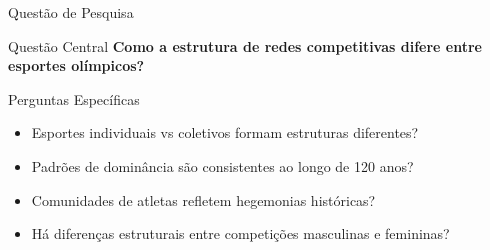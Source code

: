 \begin{frame}[shrink=5]{Questão de Pesquisa}
    \begin{alertblock}{\centering Questão Central}
        \centering
        \textbf{Como a estrutura de redes competitivas difere entre esportes olímpicos?}
    \end{alertblock}

    \vspace{0.2cm}

    \begin{block}{Perguntas Específicas}
        \footnotesize
        \begin{itemize}
            \item Esportes individuais vs coletivos formam estruturas diferentes?
            \item Padrões de dominância são consistentes ao longo de 120 anos?
            \item Comunidades de atletas refletem hegemonias históricas?
            \item Há diferenças estruturais entre competições masculinas e femininas?
        \end{itemize}
    \end{block}
\end{frame}
